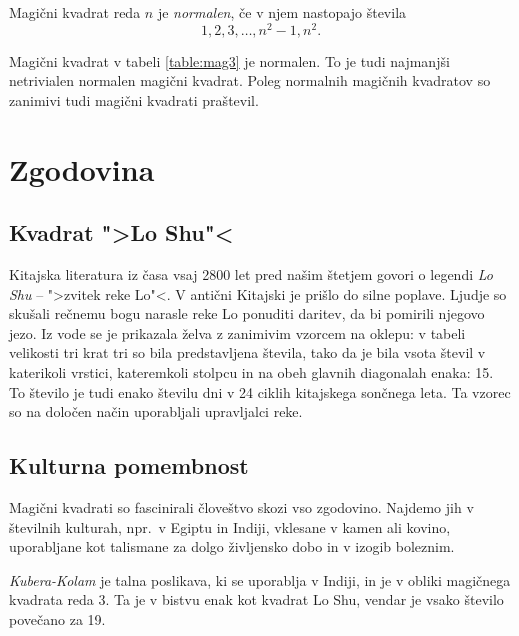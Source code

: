 \documentclass[a4paper,12pt]{article}
\begin{document}
\begin{definicija}
   Magični kvadrat reda \(n\) je \emph{normalen}, če v njem nastopajo števila
   \begin{equation}
      \label{eq:numbers}
      1, 2, 3, \ldots, n^2-1, n^2.
   \end{equation}
\end{definicija}

Magični kvadrat v tabeli \ref{table:mag3} je normalen.
To je tudi najmanjši netrivialen normalen magični kvadrat.
Poleg normalnih magičnih kvadratov so zanimivi tudi magični kvadrati praštevil. %


\section{Zgodovina}

\subsection{Kvadrat ">Lo Shu"<}

Kitajska literatura iz časa vsaj 2800 let pred našim štetjem govori o legendi
\emph{Lo Shu} -- ">zvitek reke Lo"<. V antični Kitajski je prišlo do
silne poplave. Ljudje so skušali rečnemu bogu narasle reke Lo ponuditi daritev,
da bi pomirili njegovo jezo. Iz vode se je prikazala želva z zanimivim vzorcem
na oklepu: v tabeli velikosti tri krat tri so bila predstavljena števila, tako
da je bila vsota števil v katerikoli vrstici, kateremkoli stolpcu in na obeh
glavnih diagonalah enaka: 15. To število je tudi enako številu dni v 24 ciklih
kitajskega sončnega leta. Ta vzorec so na določen način uporabljali upravljalci
reke.


\subsection{Kulturna pomembnost}

Magični kvadrati so fascinirali človeštvo skozi vso zgodovino. Najdemo jih
v številnih kulturah, npr.\ v Egiptu in Indiji, vklesane v kamen ali
kovino, uporabljane kot talismane za dolgo življensko dobo in v
izogib boleznim.

\emph{Kubera-Kolam} je talna poslikava, ki se uporablja v Indiji, in je v
obliki magičnega kvadrata reda 3. Ta je v bistvu enak kot kvadrat
Lo Shu, vendar je vsako število povečano za 19.
\end{document}
